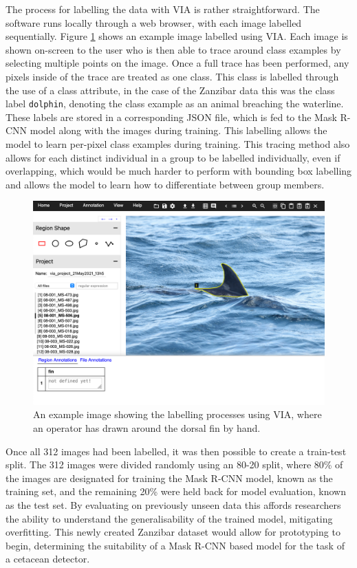 The process for labelling the data with VIA is rather straightforward. The software runs locally through a web browser, with each image labelled sequentially. Figure \ref{fig:via-json-example-zanzibar} shows an example image labelled using VIA. Each image is shown on-screen to the user who is then able to trace around class examples by selecting multiple points on the image. Once a full trace has been performed, any pixels inside of the trace are treated as one class. This class is labelled through the use of a class attribute, in the case of the Zanzibar data this was the class label \texttt{dolphin}, denoting the class example as an animal breaching the waterline. These labels are stored in a corresponding JSON file, which is fed to the Mask R-CNN model along with the images during training. This labelling allows the model to learn per-pixel class examples during training. This tracing method also allows for each distinct individual in a group to be labelled individually, even if overlapping, which would be much harder to perform with bounding box labelling and allows the model to learn how to differentiate between group members.  

  \begin{figure}
	\begin{center}
		\includegraphics[scale=0.4]{Chapter3/figs/via-json-example-zanzibar-1.png}
	\end{center}
	\caption{An example image showing the labelling processes using VIA, where an operator has drawn around the dorsal fin by hand.
	}
	\label{fig:via-json-example-zanzibar}
\end{figure}

Once all 312 images had been labelled, it was then possible to create a train-test split. The 312 images were divided randomly using an 80-20 split, where 80\% of the images are designated for training the Mask R-CNN model, known as the training set, and the remaining 20\% were held back for model evaluation, known as the test set. By evaluating on previously unseen data this affords researchers the ability to understand the generalisability of the trained model, mitigating overfitting. This newly created Zanzibar dataset would allow for prototyping to begin, determining the suitability of a Mask R-CNN based model for the task of a cetacean detector. 

